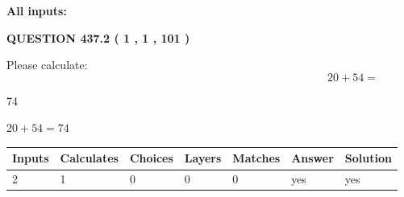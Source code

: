 \documentclass[12pt]{article}
\begin{document}
   
\noindent{}
   
   
   
   
\noindent\vspace{0.1in}\hspace{-0.08in} {\textbf{\Large{All inputs: }}}
   
   
  
\vspace{0.2in}
  
{\textbf{\Large{QUESTION
437.2 
 ( 1 , 1 , 101 )
}}}
  
  
 
Please calculate:
\begin{equation}
20 +  %
54 = \nonumber
\end{equation}
 
 
 
\noindent{}
 
 

74
 
 
\noindent{}
 
 

 
 
 
\noindent{}
 
 

$ %
20 +  %
54=   %
74$
 
 
\noindent{}
 
 

 
   
   
   
   
\noindent\begin{tabular}{|l|l|l|l|l|l|l|}
 \hline
Inputs & Calculates & Choices & Layers & Matches & Answer & Solution \\ \hline
 2  & 
 1  & 
 0
  & 
 0  & 
 0  & 
  yes & 
  yes 
  \\ \hline
 \end{tabular}
   
   
   
   
\noindent{}
   
   
  
\end{document}
